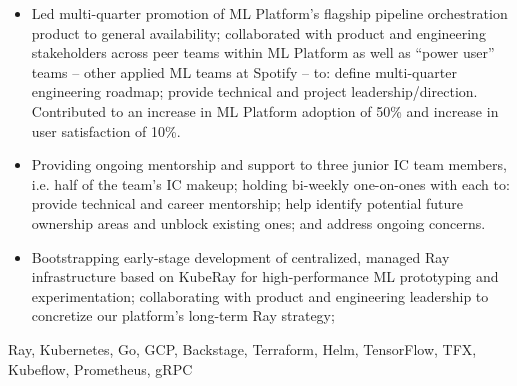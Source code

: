 \documentclass[alternative,10pt,compact]{yaac-another-awesome-cv}
\begin{document}
\begin{experiences}
{\begin{itemize}
        \item Led multi-quarter promotion of ML Platform's flagship pipeline
          orchestration product to general availability; collaborated with
          product and engineering stakeholders across peer teams within ML
          Platform as well as ``power user'' teams -- other applied ML teams at
          Spotify -- to: define multi-quarter engineering roadmap; provide
          technical and project leadership/direction. Contributed to an increase
          in ML Platform adoption of 50\% and increase in user satisfaction of
          10\%.

        \item Providing ongoing mentorship and support to three junior IC team
          members, i.e. half of the team's IC makeup; holding bi-weekly
          one-on-ones with each to: provide technical and career mentorship;
          help identify potential future ownership areas and unblock existing
          ones; and address ongoing concerns.


      \item Bootstrapping early-stage development of centralized, managed Ray
        infrastructure based on KubeRay for high-performance ML prototyping and
        experimentation; collaborating with product and engineering leadership
        to concretize our platform's long-term Ray strategy;
      \end{itemize}
    }
    {Ray, Kubernetes, Go, GCP, Backstage, Terraform, Helm, TensorFlow, TFX, Kubeflow, Prometheus, gRPC}

\emptySeparator


\end{experiences}
\end{document}
